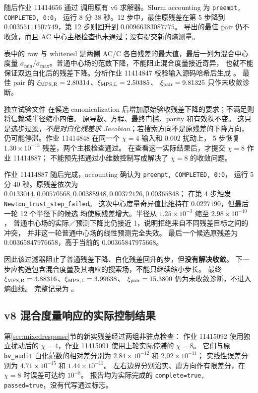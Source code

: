 \documentclass[11pt]{article}
\newcommand{\code}[1]{{\small\texttt{#1}}}
\begin{document}
随后作业 11414656 通过 
调用原有 v6 求解器。Slurm accounting 为 \code{preempt, COMPLETED, 0:0}，
运行 8 分 38 秒。12 步中，最佳原残差在第 5 步降到
$0.00355111507749$，第 12 步则回升到 $0.00966383087775$。
导出的最佳 pair 仍不收敛，而且 AC 中心主根检查也未通过；没有提交新的熵测量。

\begin{center}\small

\end{center}
表中的 raw 与 whitened 是两侧 AC/C 各自残差的最大值，最后一列为混合中心度量
$\sigma_{\min}/\sigma_{\max}$。普通中心场的范数下降，不能阻止混合度量接近奇异，
也就不能保证双边白化后的残差下降。分析作业 11414847 校验输入源码哈希后生成
。
最佳 pair 的 $\xi_{\rm MPS,R}=2.80314$、$\xi_{\rm MPS,L}=2.50385$、
$\xi_{\rm pair}=9.81325$ 只作未收敛诊断。

独立试验文件 
在候选 canonicalization 后增加原始验收残差下降的要求；不满足则将信赖域半径缩小四倍。
原导数、方程、最终门槛、parity 和有效秩不变。
这只是选步过滤，\emph{不是对白化残差求 Jacobian}；若搜索方向不是原残差的下降方向，
仍可能停滞。作业 11414848 在同一个 $\chi=4$ 输入和 $0.002$ 扰动上，
5 步恢复 $1.30\times10^{-13}$ 残差，两个主根检查通过。
在查看这一实际结果后，才提交 $\chi=8$ 作业 11414887；
不能预先把通过小维数控制写成解决了 $\chi=8$ 的收敛问题。

作业 11414887 随后完成，accounting 确认为 \code{preempt, COMPLETED, 0:0}，
运行 5 分 40 秒。原残差依次为
$0.0133014,0.00570568,0.00388948,0.00372126,0.00365848$；
在第 4 步触发 \code{Newton\_trust\_step\_failed}。
这次中心度量奇异值比维持在 $0.0227190$，但最后一轮 12 个半径下的候选
均使原残差增大。半径从 $1.25\times10^{-3}$ 缩至 $2.98\times10^{-10}$，
普通中心场的实际／预测下降比仍接近 1，说明拒绝来自不同残差目标之间的冲突，
并非这一轮普通中心场的线性预测完全失效。
最后一个候选原残差为 $0.00365847976658$，高于当前的 $0.00365847975668$。

因此该过滤器阻止了普通残差下降、白化残差回升的步，但\textbf{没有解决收敛}。
下一步应构造包含混合度量及其响应的搜索场，不能只继续缩小步长。
最终 $\xi_{\rm MPS,R}=3.88316$、$\xi_{\rm MPS,L}=3.99638$、
$\xi_{\rm pair}=15.3800$ 仍为未收敛诊断，不进入熵曲线。
完整记录为 。

\subsection{v8 混合度量响应的实际控制结果}
第\ref{sec:mixedresponse}节的新实残差经过两组非驻点检查：
作业 11415092 使用独立扰动后的 $\chi=4$，作业 11415091 使用上轮实际停滞的 $\chi=8$。
它们与原 \code{bv\_audit} 白化范数的相对差分别为
$2.84\times10^{-12}$ 和 $2.02\times10^{-11}$；
实线性误差分别为 $4.71\times10^{-15}$ 和 $1.44\times10^{-13}$。
左右边界分别沿实、虚方向作有限差分，在 $\chi=8$ 时误差可达约 $10^{-8}$。
报告均为实际完成的 \code{complete=true, passed=true}，没有代写通过标志。
\end{document}
